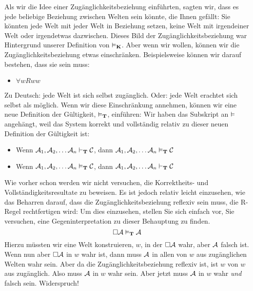 Als wir die Idee einer Zugänglichkeitsbeziehung einführten, sagten wir, dass es jede beliebige Beziehung zwischen Welten sein könnte, die Ihnen gefällt: Sie könnten jede Welt mit jeder Welt in Beziehung setzen, keine Welt mit irgendeiner Welt oder irgendetwas dazwischen. Dieses Bild der Zugänglichkeitsbeziehung war Hintergrund unserer Definition von $\vDash_{\mathbf{K}}$. Aber wenn wir wollen, können wir die Zugänglichkeitsbeziehung etwas einschränken. Beispielsweise können wir darauf bestehen, dass sie  sein muss:
\begin{itemize}
	\item $\forall wRww$
\end{itemize}
Zu Deutsch: jede Welt ist sich selbst zugänglich. Oder: jede Welt erachtet sich selbst als möglich. Wenn wir diese Einschränkung annehmen, können wir eine neue Definition der Gültigkeit, $\vDash_{\mathbf{T}}$, einführen:
Wir haben das \mlT{} Subskript an $\vDash$ angehängt, weil das System \mlT{} korrekt und vollständig relativ zu dieser neuen Definition der Gültigkeit ist:
\begin{itemize}
	\item Wenn $\mathcal{A}_1,\mathcal{A}_2, \dots \mathcal{A}_n\vdash_{\mathbf{T}}\mathcal{C}$, dann $\mathcal{A}_1,\mathcal{A}_2, \dots \mathcal{A}_n\vDash_{\mathbf{T}}\mathcal{C}$
	\item Wenn $\mathcal{A}_1,\mathcal{A}_2, \dots \mathcal{A}_n\vDash_{\mathbf{T}}\mathcal{C}$, dann $\mathcal{A}_1,\mathcal{A}_2, \dots \mathcal{A}_n\vdash_{\mathbf{T}}\mathcal{C}$
\end{itemize}
Wie vorher schon werden wir nicht versuchen, die Korrektheits- und Vollständigkeitsresultate zu beweisen. Es ist jedoch relativ leicht einzusehen, wie das Beharren darauf, dass die Zugänglichkeitsbeziehung reflexiv sein muss, die R\mlT{}-Regel rechtfertigen wird:
Um dies einzusehen, stellen Sie sich einfach vor, Sie versuchen, eine Gegeninterpretation zu dieser Behauptung zu finden.
\[
\Box \mathcal{A}\vDash_{\mathbf{T}} \mathcal{A}
\]
Hierzu müssten wir eine Welt konstruieren, $w$, in der $\Box \mathcal{A}$ wahr, aber $\mathcal{A}$ falsch ist. Wenn nun aber $\Box \mathcal{A}$ in $w$ wahr ist, dann muss $\mathcal{A}$ in allen von $w$ aus zugänglichen Welten wahr sein. Aber da die Zugänglichkeitsbeziehung reflexiv ist, ist $w$ von $w$ aus zugänglich. Also muss $\mathcal{A}$ in $w$ wahr sein. Aber jetzt muss $\mathcal{A}$ in $w$ wahr \emph{und} falsch sein. Widerspruch!

